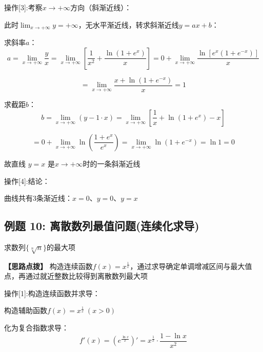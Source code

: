 \documentclass[11pt,a4paper,UTF8]{ctexart}
\begin{document}
操作[3]:考察$x \to +\infty$方向（斜渐近线）：

\begin{solbox}[分步推导与答题规范]
此时$\lim_{x \to +\infty} y = +\infty$，无水平渐近线，转求斜渐近线$y = ax + b$：

求斜率$a$：
\begin{equation*}
a = \lim_{x \to +\infty} \frac{y}{x} = \lim_{x \to +\infty} \left[\frac{1}{x^2} + \frac{\ln(1 + e^x)}{x}\right] = 0 + \lim_{x \to +\infty} \frac{\ln[e^x(1 + e^{-x})]}{x}
\end{equation*}



\begin{equation*}
= \lim_{x \to +\infty} \frac{x + \ln(1 + e^{-x})}{x} = 1
\end{equation*}


求截距$b$：
\begin{equation*}
b = \lim_{x \to +\infty} (y - 1 \cdot x) = \lim_{x \to +\infty} \left[\frac{1}{x} + \ln(1 + e^x) - x\right]
\end{equation*}



\begin{equation*}
= 0 + \lim_{x \to +\infty} \ln\left(\frac{1 + e^x}{e^x}\right) = \lim_{x \to +\infty} \ln(1 + e^{-x}) = \ln 1 = 0
\end{equation*}


故直线 $y = x$ 是$x \to +\infty$时的一条斜渐近线
\end{solbox}

操作[4]:结论：

\begin{solbox}[分步推导与答题规范]
曲线共有3条渐近线：$x = 0$、$y = 0$、$y = x$
\end{solbox}


\subsection{例题 10: 离散数列最值问题(连续化求导)}

求数列$\{\sqrt[n]{n}\}$的最大项

\textbf{\color{DeepPurple}【思路点拨】} 构造连续函数$f(x) = x^{\frac{1}{x}}$，通过求导确定单调增减区间与最大值点，再通过就近整数比较得到离散数列最大项


操作[1]:构造连续函数并求导：

\begin{solbox}[分步推导与答题规范]
构造辅助函数$f(x) = x^{\frac{1}{x}}\ (x > 0)$

化为复合指数求导：
\begin{equation*}
f'(x) = \left(e^{\frac{\ln x}{x}}\right)' = x^{\frac{1}{x}} \cdot \frac{1 - \ln x}{x^2}
\end{equation*}


\end{solbox}
\end{document}
